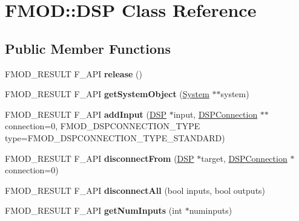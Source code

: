 \hypertarget{classFMOD_1_1DSP}{}\section{F\+M\+OD\+:\+:D\+SP Class Reference}
\label{classFMOD_1_1DSP}
\subsection*{Public Member Functions}
\begin{DoxyCompactItemize}
\item 
\mbox{\label{classFMOD_1_1DSP_a4ffd9dbcf1b0119a2ab94d27744ee033}} 
F\+M\+O\+D\+\_\+\+R\+E\+S\+U\+LT F\+\_\+\+A\+PI {\bfseries release} ()
\item 
\mbox{\label{classFMOD_1_1DSP_a06bef2d5b365de903e12fff814da31c7}} 
F\+M\+O\+D\+\_\+\+R\+E\+S\+U\+LT F\+\_\+\+A\+PI {\bfseries get\+System\+Object} (\hyperlink{classFMOD_1_1System}{System} $\ast$$\ast$system)
\item 
\mbox{\label{classFMOD_1_1DSP_abc7912fc7a012c1d47254a9ef8abbe73}} 
F\+M\+O\+D\+\_\+\+R\+E\+S\+U\+LT F\+\_\+\+A\+PI {\bfseries add\+Input} (\hyperlink{classFMOD_1_1DSP}{D\+SP} $\ast$input, \hyperlink{classFMOD_1_1DSPConnection}{D\+S\+P\+Connection} $\ast$$\ast$connection=0, F\+M\+O\+D\+\_\+\+D\+S\+P\+C\+O\+N\+N\+E\+C\+T\+I\+O\+N\+\_\+\+T\+Y\+PE type=F\+M\+O\+D\+\_\+\+D\+S\+P\+C\+O\+N\+N\+E\+C\+T\+I\+O\+N\+\_\+\+T\+Y\+P\+E\+\_\+\+S\+T\+A\+N\+D\+A\+RD)
\item 
\mbox{\label{classFMOD_1_1DSP_aecd8d581ef5bfc1c04b8b5859b7920f8}} 
F\+M\+O\+D\+\_\+\+R\+E\+S\+U\+LT F\+\_\+\+A\+PI {\bfseries disconnect\+From} (\hyperlink{classFMOD_1_1DSP}{D\+SP} $\ast$target, \hyperlink{classFMOD_1_1DSPConnection}{D\+S\+P\+Connection} $\ast$connection=0)
\item 
\mbox{\label{classFMOD_1_1DSP_a3eb9cfc992a069357bbebeafffad9c8e}} 
F\+M\+O\+D\+\_\+\+R\+E\+S\+U\+LT F\+\_\+\+A\+PI {\bfseries disconnect\+All} (bool inputs, bool outputs)
\item 
\mbox{\label{classFMOD_1_1DSP_a20667543975afbb53cc19a1389bfd6e7}} 
F\+M\+O\+D\+\_\+\+R\+E\+S\+U\+LT F\+\_\+\+A\+PI {\bfseries get\+Num\+Inputs} (int $\ast$numinputs)

\end{DoxyCompactItemize}
